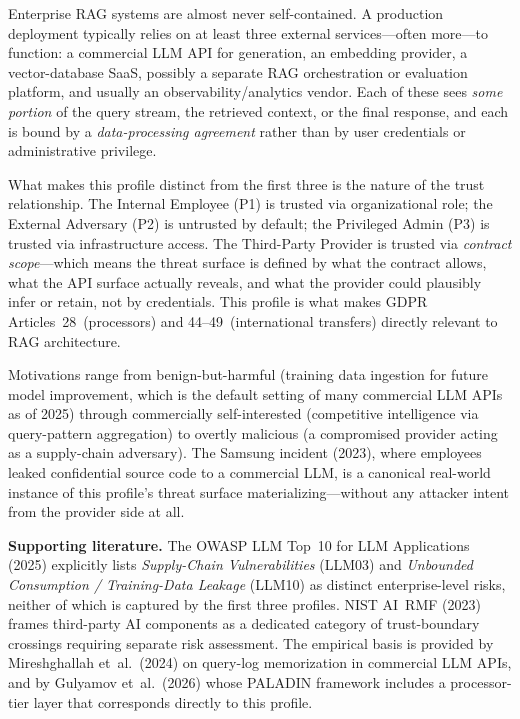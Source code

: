 \documentclass[12pt, a4paper]{report}
\begin{document}
\begin{prosebox}
Enterprise RAG systems are almost never self-contained. A production
deployment typically relies on at least three external services---often
more---to function: a commercial LLM API for generation, an embedding
provider, a vector-database SaaS, possibly a separate RAG orchestration
or evaluation platform, and usually an observability/analytics vendor. Each
of these sees \emph{some portion} of the query stream, the retrieved
context, or the final response, and each is bound by a
\emph{data-processing agreement} rather than by user credentials or
administrative privilege.

What makes this profile distinct from the first three is the nature of
the trust relationship. The Internal Employee (P1) is trusted via
organizational role; the External Adversary (P2) is untrusted by default;
the Privileged Admin (P3) is trusted via infrastructure access. The
Third-Party Provider is trusted via \emph{contract scope}---which means
the threat surface is defined by what the contract allows, what the API
surface actually reveals, and what the provider could plausibly infer or
retain, not by credentials. This profile is what makes GDPR
Articles~28~(processors) and 44--49~(international transfers) directly
relevant to RAG architecture.

Motivations range from benign-but-harmful (training data ingestion for
future model improvement, which is the default setting of many commercial
LLM APIs as of 2025) through commercially self-interested (competitive
intelligence via query-pattern aggregation) to overtly malicious
(a compromised provider acting as a supply-chain adversary). The Samsung
incident (2023), where employees leaked confidential source code to a
commercial LLM, is a canonical real-world instance of this profile's
threat surface materializing---without any attacker intent from the
provider side at all.

\medskip
\textbf{Supporting literature.}
The OWASP LLM Top~10 for LLM Applications (2025) explicitly lists
\emph{Supply-Chain Vulnerabilities} (LLM03) and \emph{Unbounded Consumption /
Training-Data Leakage} (LLM10) as distinct enterprise-level risks,
neither of which is captured by the first three profiles.
NIST AI~RMF (2023) frames third-party AI components as a dedicated
category of trust-boundary crossings requiring separate risk assessment.
The empirical basis is provided by Mireshghallah et~al.\ (2024) on
query-log memorization in commercial LLM APIs, and by
Gulyamov et~al.\ (2026) whose PALADIN framework includes a processor-tier
layer that corresponds directly to this profile.
\end{prosebox}
\end{document}
